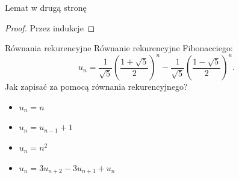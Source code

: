 \documentclass[handout]{beamer}
\theoremstyle{definition}
\begin{document}
\begin{frame}{Lemat w drugą stronę}

\begin{proof}
    Przez indukcje
\end{proof}
\end{frame}



\begin{frame}{Równania rekurencyjne}
Równanie rekurencyjne Fibonacciego: 
$$
{\displaystyle u_{n}={\frac {1}{\sqrt {5}}}\left({\frac {1+{\sqrt {5}}}{2}}\right)^{n}-{\frac {1}{\sqrt {5}}}\left({\frac {1-{\sqrt {5}}}{2}}\right)^{n}.}
$$
 Jak zapisać za pomocą równania rekurencyjnego? 
\begin{itemize}
    \item  $u_n = n$
    \pause 
    \item $u_n = u_{n-1} + 1$
    \pause
    \item  $u_n = n^{2}$
    \pause
    \item $u_n = 3 u_{n+2} - 3u_{n+1} + u_n$

\end{itemize}

\end{frame}
\end{document}
